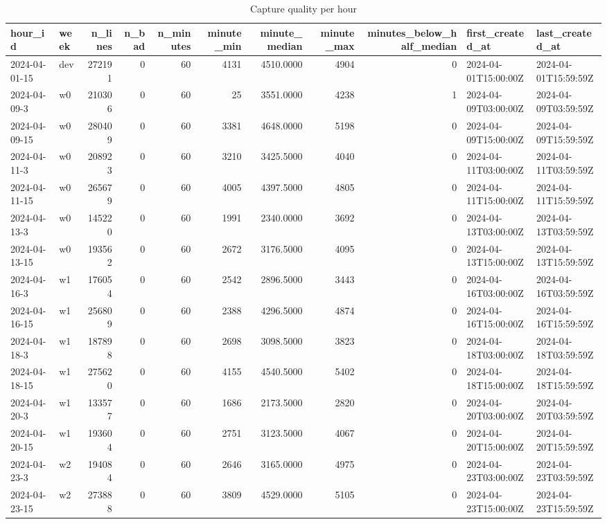 \begin{table}
\caption{Capture quality per hour}
\label{tab:tab_hour_quality}
\begin{tabular}{llrrrrrrrll}
\toprule
hour\_id & week & n\_lines & n\_bad & n\_minutes & minute\_min & minute\_median & minute\_max & minutes\_below\_half\_median & first\_created\_at & last\_created\_at \\
\midrule
2024-04-01-15 & dev & 272191 & 0 & 60 & 4131 & 4510.0000 & 4904 & 0 & 2024-04-01T15:00:00Z & 2024-04-01T15:59:59Z \\
2024-04-09-3 & w0 & 210306 & 0 & 60 & 25 & 3551.0000 & 4238 & 1 & 2024-04-09T03:00:00Z & 2024-04-09T03:59:59Z \\
2024-04-09-15 & w0 & 280409 & 0 & 60 & 3381 & 4648.0000 & 5198 & 0 & 2024-04-09T15:00:00Z & 2024-04-09T15:59:59Z \\
2024-04-11-3 & w0 & 208923 & 0 & 60 & 3210 & 3425.5000 & 4040 & 0 & 2024-04-11T03:00:00Z & 2024-04-11T03:59:59Z \\
2024-04-11-15 & w0 & 265679 & 0 & 60 & 4005 & 4397.5000 & 4805 & 0 & 2024-04-11T15:00:00Z & 2024-04-11T15:59:59Z \\
2024-04-13-3 & w0 & 145220 & 0 & 60 & 1991 & 2340.0000 & 3692 & 0 & 2024-04-13T03:00:00Z & 2024-04-13T03:59:59Z \\
2024-04-13-15 & w0 & 193562 & 0 & 60 & 2672 & 3176.5000 & 4095 & 0 & 2024-04-13T15:00:00Z & 2024-04-13T15:59:59Z \\
2024-04-16-3 & w1 & 176054 & 0 & 60 & 2542 & 2896.5000 & 3443 & 0 & 2024-04-16T03:00:00Z & 2024-04-16T03:59:59Z \\
2024-04-16-15 & w1 & 256809 & 0 & 60 & 2388 & 4296.5000 & 4874 & 0 & 2024-04-16T15:00:00Z & 2024-04-16T15:59:59Z \\
2024-04-18-3 & w1 & 187898 & 0 & 60 & 2698 & 3098.5000 & 3823 & 0 & 2024-04-18T03:00:00Z & 2024-04-18T03:59:59Z \\
2024-04-18-15 & w1 & 275620 & 0 & 60 & 4155 & 4540.5000 & 5402 & 0 & 2024-04-18T15:00:00Z & 2024-04-18T15:59:59Z \\
2024-04-20-3 & w1 & 133577 & 0 & 60 & 1686 & 2173.5000 & 2820 & 0 & 2024-04-20T03:00:00Z & 2024-04-20T03:59:59Z \\
2024-04-20-15 & w1 & 193604 & 0 & 60 & 2751 & 3123.5000 & 4067 & 0 & 2024-04-20T15:00:00Z & 2024-04-20T15:59:59Z \\
2024-04-23-3 & w2 & 194084 & 0 & 60 & 2646 & 3165.0000 & 4975 & 0 & 2024-04-23T03:00:00Z & 2024-04-23T03:59:59Z \\
2024-04-23-15 & w2 & 273888 & 0 & 60 & 3809 & 4529.0000 & 5105 & 0 & 2024-04-23T15:00:00Z & 2024-04-23T15:59:59Z \\

\end{tabular}
\end{table}
